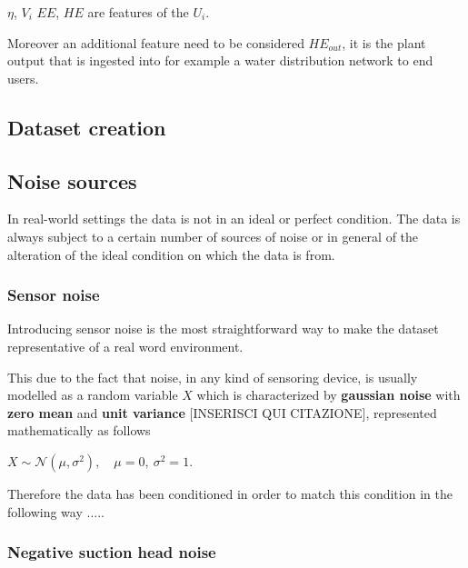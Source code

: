 $\eta$, $V_i$ $EE$, $HE$ are features of the $U_i$.

Moreover an additional feature need to be considered $HE_{out}$, it is the plant output that is ingested into for example a water distribution network to end users.

\subsection{Dataset creation}




\subsection{Noise sources}

In real-world settings the data is not in an ideal or perfect condition. The data is always subject to a certain number of sources of noise or in general of the alteration of the ideal condition on which the data is from. 


\subsubsection{Sensor noise}

Introducing sensor noise is the most straightforward way to make the dataset representative of a real word environment. 

This due to the fact that noise, in any kind of sensoring device, is usually modelled as a random variable $X$ which is characterized by \textbf{gaussian noise} with \textbf{zero mean} and \textbf{unit variance} [INSERISCI QUI CITAZIONE], represented mathematically as follows 

$X \sim \mathcal{N}(\mu,\sigma^2), \quad \mu = 0,\ \sigma^2 = 1$. 

Therefore the data has been conditioned in order to match this condition in the following way .....



\subsubsection{Negative suction head noise}


